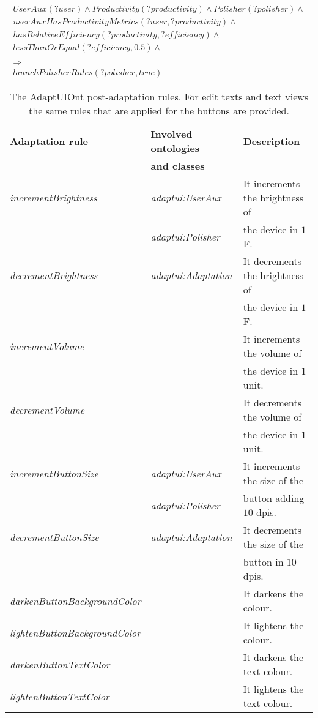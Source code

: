 \footnotesize
\begin{equation} \label{ec:usability_rule}
  \begin{align*} 
  UserAux(?user) ∧ Productivity(?productivity) ∧ Polisher(?polisher) ∧\\ 
  userAuxHasProductivityMetrics(?user, ?productivity) ∧ \\
  hasRelativeEfficiency(?productivity, ?efficiency) ∧ \\
  lessThanOrEqual(?efficiency, 0.5) ∧ \\
  \\
  \Rightarrow \\
  launchPolisherRules(?polisher, true)
  \end{align*}
\end{equation}
\normalsize

\begin{table}
  \caption{The AdaptUIOnt post-adaptation rules. For edit texts and text views
  the same rules that are applied for the buttons are provided.}
 \label{tbl:post_adaptation_rules}
\footnotesize
\centering
 \begin{tabular}{l l l}
  \hline 
  \textbf{Adaptation rule} 	& \textbf{Involved ontologies} 	& \textbf{Description} 		\\
				& \textbf{and classes} 		& 				\\
  \hline
  \textit{incrementBrightness}	& \textit{adaptui:UserAux}	& It increments the brightness of\\
				& \textit{adaptui:Polisher}	& the device in $1$F.		\\
  \textit{decrementBrightness}	& \textit{adaptui:Adaptation}	& It decrements the brightness of\\
				& 				& the device in $1$F.		\\
  \textit{incrementVolume}	& 				& It increments the volume of	\\
				& 				& the device in $1$ unit.	\\
  \textit{decrementVolume}	& 				& It decrements the volume of	\\
				& 				& the device in $1$ unit.	\\
  \hline
  \textit{incrementButtonSize}	& \textit{adaptui:UserAux}	& It increments the size of the \\
				& \textit{adaptui:Polisher}	& button adding $10$ dpis. 	\\
  \textit{decrementButtonSize}	& \textit{adaptui:Adaptation}	& It decrements the size of the \\
				& 				& button in $10$ dpis.		\\
  \textit{darkenButtonBackgroundColor}&				& It darkens the colour.	\\
  \textit{lightenButtonBackgroundColor}&			& It lightens the colour.	\\
  \textit{darkenButtonTextColor}&				& It darkens the text colour.	\\
  \textit{lightenButtonTextColor}&				& It lightens the text colour.	\\
  \hline
\end{tabular}
\end{table}

